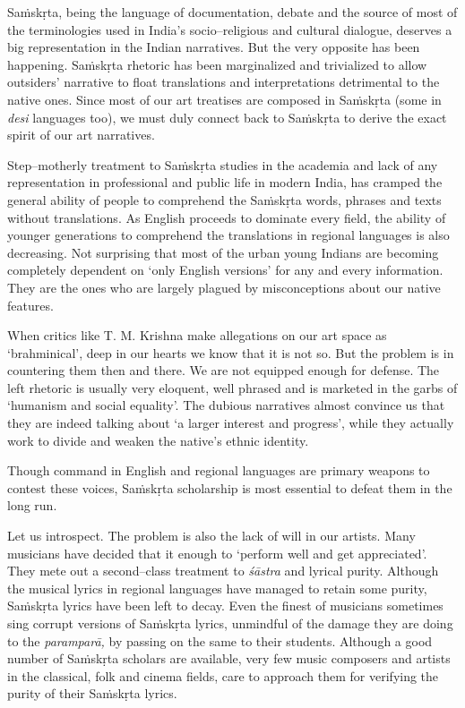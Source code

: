 Saṁskṛta, being the language of documentation, debate and the source of most of the terminologies used in India’s socio–religious and cultural dialogue, deserves a big representation in the Indian narratives. But the very opposite has been happening. Saṁskṛta rhetoric has been marginalized and trivialized to allow outsiders’  narrative to float translations and interpretations detrimental to the native ones. Since most of our art treatises are composed in Saṁskṛta (some in \textit{desi} languages too), we must duly connect back to Saṁskṛta to derive the exact spirit of our art narratives.

Step–motherly treatment to Saṁskṛta studies in the academia and lack of any representation in professional and public life in modern India, has cramped the general ability of people to comprehend the Saṁskṛta words, phrases and texts without translations. As English proceeds to dominate every field, the ability of younger generations to comprehend the translations in regional languages is also decreasing. Not surprising that most of the urban young Indians are becoming completely dependent on ‘only English versions’ for any and every information. They are the ones who are largely plagued by misconceptions about our native features.

When critics like T. M. Krishna make allegations on our art space as ‘brahminical’, deep in our hearts we know that it is not so. But the problem is in countering them then and there. We are not equipped enough for defense. The left rhetoric is usually very eloquent, well phrased and is marketed in the garbs of ‘humanism and social equality’. The dubious narratives almost convince us that they are indeed talking about ‘a larger interest and progress’, while they actually work to divide and weaken the native’s ethnic identity.

Though command in English and regional languages are primary weapons to contest these voices, Saṁskṛta scholarship is most essential to defeat them in the long run.

Let us introspect. The problem is also the lack of will in our artists. Many musicians have decided that it enough to ‘perform well and get appreciated’. They mete out a second–class treatment to \textit{śāstra} and lyrical purity. Although the musical lyrics in regional languages have managed to retain some purity, Saṁskṛta lyrics have been left to decay. Even the finest of musicians sometimes sing corrupt versions of Saṁskṛta lyrics, unmindful of the damage they are doing to the \textit{paramparā,} by passing on the same to their students. Although a good number of Saṁskṛta scholars are available, very few music composers and artists in the classical, folk and cinema fields, care to approach them for verifying the purity of their Saṁskṛta lyrics.

